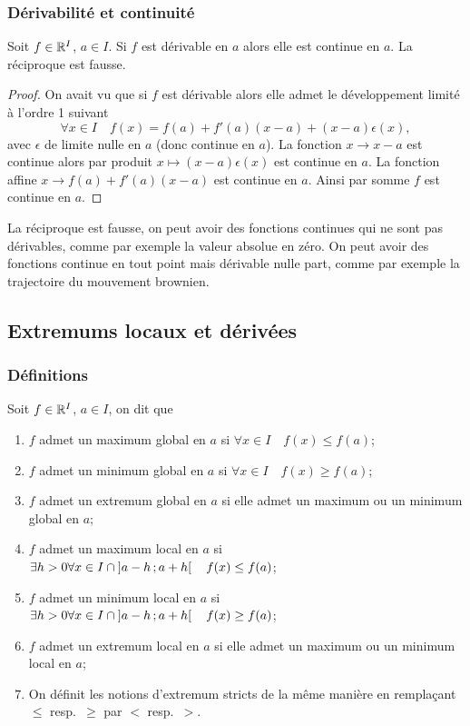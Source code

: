 \subsubsection{Dérivabilité et continuité}

\begin{prop}
  Soit $f \in \mathbb{R}^I$, $a \in I$. Si $f$ est dérivable en $a$ alors elle est continue en $a$. La réciproque est fausse.
\end{prop}
\begin{proof}
  On avait vu que si $f$ est dérivable alors elle admet le développement limité à l'ordre 1 suivant
  \begin{equation}
    \forall x \in I \quad f(x)=f(a)+f'(a)(x-a)+(x-a)\epsilon(x),
  \end{equation}
  avec $\epsilon$ de limite nulle en $a$ (donc continue en $a$). La fonction $x \longrightarrow x-a$ est continue alors par produit $x \longmapsto (x-a)\epsilon(x)$ est continue en $a$. La fonction affine $x \longrightarrow f(a)+f'(a)(x-a)$ est continue en $a$. Ainsi par somme $f$ est continue en $a$.
\end{proof}
La réciproque est fausse, on peut avoir des fonctions continues qui ne sont pas dérivables, comme par exemple la valeur absolue en zéro. On peut avoir des fonctions continue en tout point mais dérivable nulle part, comme par exemple la trajectoire du mouvement brownien.

\subsection{Extremums locaux et dérivées}

\subsubsection{Définitions}

Soit $f \in \mathbb{R}^I$, $a \in I$, on dit que
\begin{enumerate}
\item $f$ admet un maximum global en $a$ si $\forall x \in I \quad f(x) \leq f(a)$;
\item $f$ admet un minimum global en $a$ si $\forall x \in I \quad f(x) \geq f(a)$;
\item $f$ admet un extremum global en $a$ si elle admet un maximum ou un minimum global en $a$;
\item $f$ admet un maximum local en $a$ si $\exists h > 0 \forall x \in I \cap \left] a-h \, ;  a+h \right[  \quad f(x) \leq f(a)$;
\item $f$ admet un minimum local en $a$ si $\exists h > 0 \forall x \in I \cap \left] a-h \, ;  a+h \right[ \quad f(x) \geq f(a)$;
\item $f$ admet un extremum local en $a$ si elle admet un maximum ou un minimum local en $a$;
\item On définit les notions d'extremum stricts de la même manière en remplaçant $\leq$ resp.\ $\geq$ par $<$ resp.\ $>$.
\end{enumerate}

